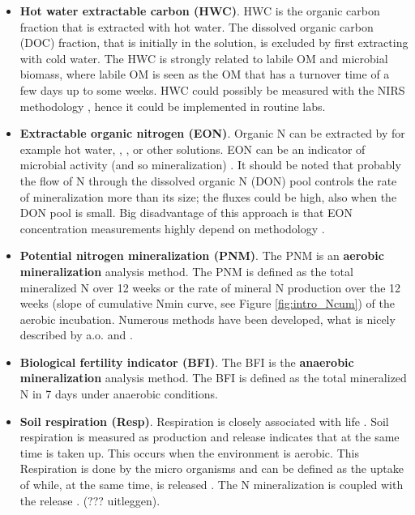 \documentclass[10pt,twoside,dutch,english]{report}
\begin{document}
\begin{itemize}
	\item \textbf{Hot water extractable carbon (HWC)}. HWC is the organic carbon fraction that is extracted with hot water. The dissolved organic carbon (DOC) fraction, that is initially in the solution, is excluded by first extracting with cold water.  The HWC is strongly related to labile OM and microbial biomass\citep{Ghani2002, Ghani2003}, where labile OM is seen as the OM that has a turnover time of a few days up to some weeks. HWC could possibly be measured with the NIRS methodology \citep{Vasques2009}, hence it could be implemented in routine labs. 
	\item \textbf{Extractable organic nitrogen (EON)}. Organic N can be extracted by for example hot water, , ,  or other solutions. EON can be an indicator of microbial activity (and so mineralization) \citep{Schimel2004}. It should be noted that probably the flow of N through the dissolved organic N (DON) pool controls the rate of mineralization more than its size; the fluxes could be high, also when the DON pool is small. Big disadvantage of this approach is that EON concentration measurements highly depend on methodology \citep{Ros2009}. 
%
%
	
	\item \textbf{Potential nitrogen mineralization (PNM)}. The PNM is an \textbf{aerobic mineralization} analysis method. The PNM is defined as the total mineralized N over 12 weeks or the rate of mineral N production over the 12 weeks (slope of cumulative Nmin curve, see Figure \ref{fig:intro_Ncum}) of the aerobic incubation. Numerous methods have been developed, what is nicely described by a.o. \citet{Doran1996} and \citet{Canali2005}.
	
	\item \textbf{Biological fertility indicator (BFI)}. The BFI is the \textbf{anaerobic mineralization} analysis method. The BFI is defined as the total mineralized N in 7 days under anaerobic conditions.
	
	\item \textbf{Soil respiration (Resp)}. Respiration is closely associated with life \citep{Bloem2005}. Soil respiration is measured as  production and  release indicates  that at the same time  is taken up. This occurs when the environment is aerobic. This Respiration is done by the micro organisms and can be defined as the uptake of  while, at the same time,  is released \citep{Bloem2005}. The N mineralization is coupled with the  release \citep{Geisseler2009}. (??? uitleggen). 
	

\end{itemize}
\end{document}
